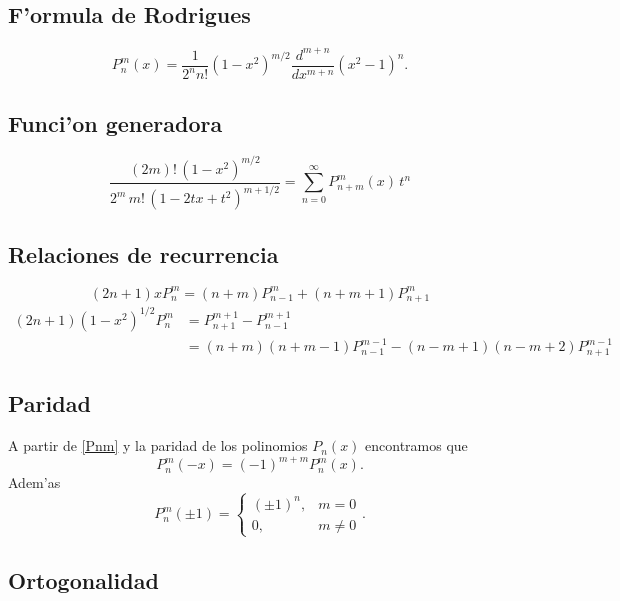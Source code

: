 \subsection{F'ormula de Rodrigues}

\begin{equation}
P_{n}^{m}(x)=\frac{1}{2^{n}n!}(1-x^2)^{m/2}\frac{d^{m+n}}{dx^{m+n}}(x^2-1)^{n}.
\end{equation}

\subsection{Funci'on generadora}

\begin{equation}
\frac{(2m)! \, (1-x^2)^{m/2}}{2^{m}\, m! \, (1-2tx+t^2)^{m+1/2}} = \sum_{n=0}^{\infty} P_{n+m}^{m}(x) \, t^n
\end{equation}


\subsection{Relaciones de recurrencia}

\begin{equation}
(2n+1)xP_n^m=(n+m)P_{n-1}^m+(n+m+1)P_{n+1}^m
\end{equation}
\begin{align}
(2n+1)(1-x^2)^{1/2}P_n^m &= P_{n+1}^{m+1}-P_{n-1}^{m+1} \\
&= (n+m)(n+m-1)P_{n-1}^{m-1}-(n-m+1)(n-m+2)P_{n+1}^{m-1}
\end{align}

\subsection{Paridad}
A partir de \eqref{Pnm} y la paridad de los polinomios $P_n(x)$ encontramos que
\begin{equation}
P_n^m(-x)=(-1)^{m+m}P_n^m(x).
\end{equation}
Adem'as
\begin{equation}
P_n^m(\pm 1)=\left\{\begin{array}{cl}
(\pm 1)^n, & m=0\\
0, & m\neq 0
\end{array}\right..
\end{equation}
\subsection{Ortogonalidad}

